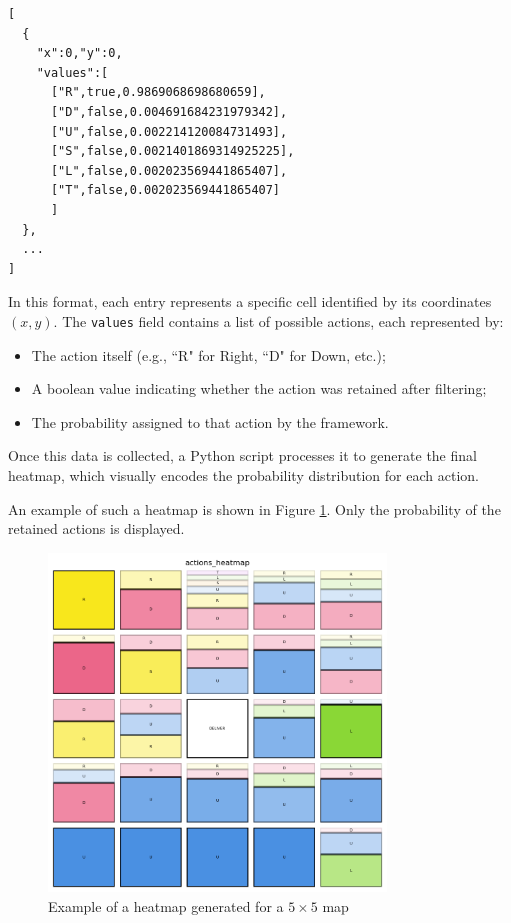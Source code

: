 \begin{verbatim}
[
  {
    "x":0,"y":0,
    "values":[
      ["R",true,0.9869068698680659],
      ["D",false,0.004691684231979342],
      ["U",false,0.002214120084731493],
      ["S",false,0.0021401869314925225],
      ["L",false,0.002023569441865407],
      ["T",false,0.002023569441865407]
      ]
  },
  ...
]
\end{verbatim}

In this format, each entry represents a specific cell identified by its coordinates
$(x,y)$. The \texttt{values} field contains a list of possible actions, each
represented by:
\begin{itemize}
  \item The action itself (e.g., ``R" for Right, ``D" for Down, etc.);

  \item A boolean value indicating whether the action was retained after filtering;

  \item The probability assigned to that action by the framework.
\end{itemize}
Once this data is collected, a Python script processes it to generate the final
heatmap, which visually encodes the probability distribution for each action.

An example of such a heatmap is shown in Figure \ref{fig:heatmap_example}. Only
the probability of the retained actions is displayed.

\begin{figure}[ht!]
  \centering
  \includegraphics[width=0.8\textwidth]{
    images/data_collection/heatmap_example.png
  }
  \caption{Example of a heatmap generated for a $5 \times 5$ map}
  \label{fig:heatmap_example}
\end{figure}

